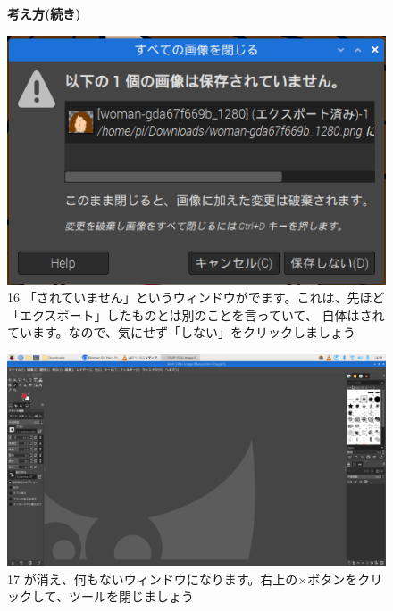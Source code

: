 \begin{figure}
  \textbf{考え方(続き)}

  \begin{minipage}{\textwidth}
    \begin{minipage}{0.45\linewidth}
      \includegraphics[width=\linewidth]{text01-img/textbook-img1031.png}\\
      16 「されていません」というウィンドウがでます。これは、先ほど「エクスポート」したものとは別のことを言っていて、
      自体はされています。なので、気にせず「しない」をクリックしましょう
    \end{minipage}
    \hfill
    \begin{minipage}{0.45\linewidth}
      \includegraphics[width=\linewidth]{text01-img/textbook-img1032.png}\\
      17 が消え、何もないウィンドウになります。右上の×ボタンをクリックして、ツールを閉じましょう
    \end{minipage}
  \end{minipage}


\end{figure}
